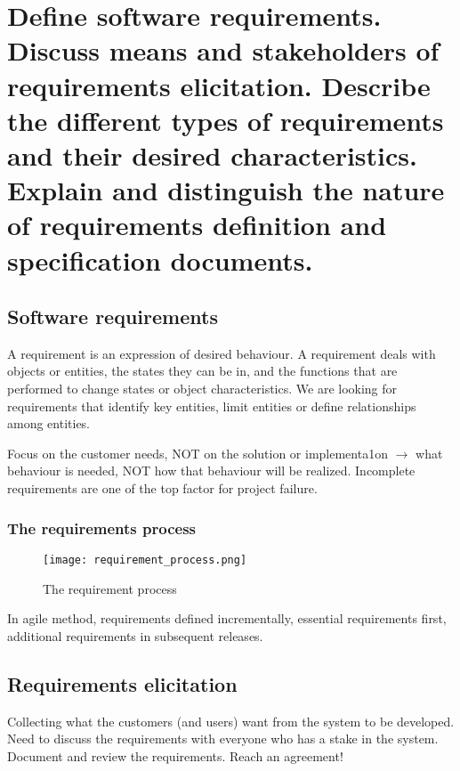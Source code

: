 \clearpage{}
\section{Define software requirements. Discuss means and stakeholders of
requirements elicitation. Describe the different types of requirements and
their desired characteristics. Explain and distinguish the nature of
requirements definition and specification documents.}

\subsection{Software requirements}

A requirement is an expression of desired behaviour. A requirement deals with objects or
entities, the states they can be in, and the functions that are performed to change states or
object characteristics. We are looking for requirements that identify key entities, limit
entities or define relationships among entities. \newline

Focus on the customer needs, NOT on the solution or implementa1on $\rightarrow$ what behaviour is
needed, NOT how that behaviour will be realized. Incomplete requirements are one of the top
factor for project failure.

\subsubsection{The requirements process}

\begin{figure}[!ht]
    \centering
    \texttt{[image: requirement\_process.png]}
    \caption{The requirement process}
\end{figure}

In agile method, requirements defined incrementally, essential requirements first,
additional requirements in subsequent releases.

\subsection{Requirements elicitation}

Collecting what the customers (and users) want from the system to be developed.
Need to discuss the requirements with everyone who has a stake in the system.
\newline
Document and review the requirements. \newline
Reach an agreement!

